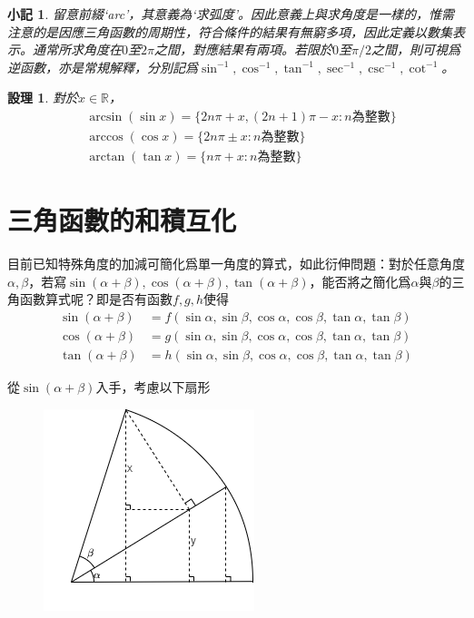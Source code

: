 \documentclass[12pt]{article}
\newtheorem*{proposition}{設理}
\newtheorem*{remark}{小記}
\begin{document}
    \begin{remark}
        留意前綴`arc'，其意義為`求弧度'。因此意義上與求角度是一樣的，惟需注意的是因應三角函數的周期性，符合條件的結果有無窮多項，因此定義以數集表示。通常所求角度在$0$至$2\pi$之間，對應結果有兩項。若限於$0$至$\pi/2$之間，則可視爲逆函數，亦是常規解釋，分別記爲$\sin^{-1},\cos^{-1},\tan^{-1},\sec^{-1},\csc^{-1},\cot^{-1}$。
    \end{remark}

    \begin{proposition}
        對於$x\in\mathbb{R}$，\begin{align*}
            &\arcsin(\sin{x})=\{2n\pi+x, (2n+1)\pi-x:n\textrm{為整數}\}\\
            &\arccos(\cos{x})=\{2n\pi\pm x:n\textrm{為整數}\}\\
            &\arctan(\tan{x})=\{n\pi+x:n\textrm{為整數}\}
        \end{align*}
    \end{proposition}

    \section*{三角函數的和積互化}

    目前已知特殊角度的加減可簡化爲單一角度的算式，如此衍伸問題：對於任意角度$\alpha,\beta$，若寫$\sin(\alpha+\beta),\cos(\alpha+\beta),\tan(\alpha+\beta)$，能否將之簡化爲$\alpha$與$\beta$的三角函數算式呢？即是否有函數$f,g,h$使得\begin{align*}
        \sin(\alpha+\beta)&=f(\sin{\alpha},\sin{\beta},\cos{\alpha},\cos{\beta},\tan{\alpha},\tan{\beta})\\
        \cos(\alpha+\beta)&=g(\sin{\alpha},\sin{\beta},\cos{\alpha},\cos{\beta},\tan{\alpha},\tan{\beta})\\
        \tan(\alpha+\beta)&=h(\sin{\alpha},\sin{\beta},\cos{\alpha},\cos{\beta},\tan{\alpha},\tan{\beta})
    \end{align*}

    從$\sin(\alpha+\beta)$入手，考慮以下扇形

    \begin{figure}[H]
        \centering
        \includegraphics[scale=0.8]{ab.png}
    \end{figure}
\end{document}
